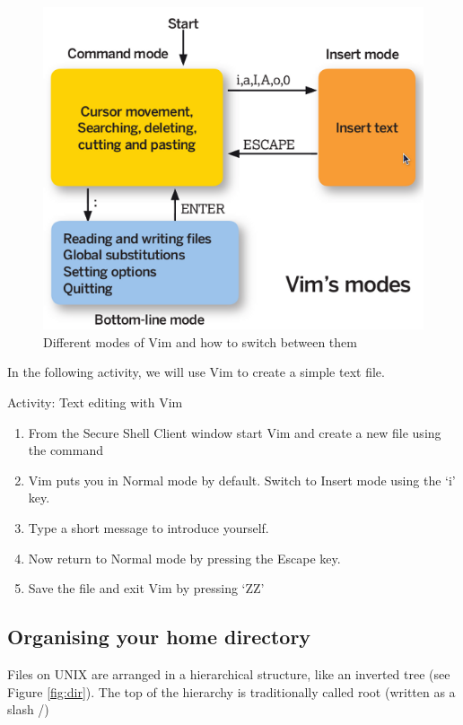 \begin{frame}
\begin{figure}
\begin{center}
\includegraphics[scale=0.4]{vim_modes}
\end{center}
\caption{Different modes of Vim and how to switch between them}
\label{fig:vim_modes}
\end{figure}
\end{frame}

In the following activity, we will use Vim to create a simple text file. 

\begin{frame}{Activity: Text editing with Vim}
\begin{enumerate}
\item From the Secure Shell Client window start Vim and create a new file using
the command 
\item Vim puts you in Normal mode by default. Switch to Insert mode using the
`i' key.  
\item Type a short message to introduce yourself.
\item Now return to Normal mode by pressing the Escape key.  
\item Save the file and exit Vim by pressing `ZZ' 
\end{enumerate}
\end{frame}

\subsection{Organising your home directory}
Files on UNIX are arranged in a hierarchical structure, like an inverted tree
(see Figure \ref{fig:dir}).  The top of the hierarchy is traditionally called
root (written as a slash /)


